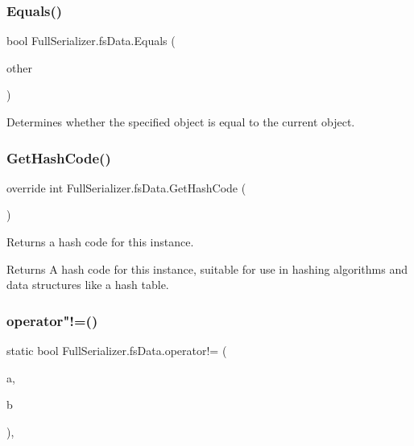 \subsubsection{\texorpdfstring{Equals()}{Equals()}\hspace{0.1cm}{\footnotesize\ttfamily [2/2]}}
{\footnotesize\ttfamily bool Full\+Serializer.\+fs\+Data.\+Equals (\begin{DoxyParamCaption}\item[{\hyperlink{class_full_serializer_1_1fs_data}{fs\+Data}}]{other }\end{DoxyParamCaption})\hspace{0.3cm}{\ttfamily [inline]}}



Determines whether the specified object is equal to the current object. 

\mbox{\label{class_full_serializer_1_1fs_data_a915cae40a9014f6027c2b88e35d74e8c}} 
\subsubsection{\texorpdfstring{Get\+Hash\+Code()}{GetHashCode()}}
{\footnotesize\ttfamily override int Full\+Serializer.\+fs\+Data.\+Get\+Hash\+Code (\begin{DoxyParamCaption}{ }\end{DoxyParamCaption})\hspace{0.3cm}{\ttfamily [inline]}}



Returns a hash code for this instance. 

\begin{DoxyReturn}{Returns}
A hash code for this instance, suitable for use in hashing algorithms and data structures like a hash table.
\end{DoxyReturn}
\mbox{\label{class_full_serializer_1_1fs_data_ae595530d43b82d4f7e6190b880932624}} 
\subsubsection{\texorpdfstring{operator"!=()}{operator!=()}}
{\footnotesize\ttfamily static bool Full\+Serializer.\+fs\+Data.\+operator!= (\begin{DoxyParamCaption}\item[{\hyperlink{class_full_serializer_1_1fs_data}{fs\+Data}}]{a,  }\item[{\hyperlink{class_full_serializer_1_1fs_data}{fs\+Data}}]{b }\end{DoxyParamCaption})\hspace{0.3cm}{\ttfamily [inline]}, {\ttfamily [static]}}



